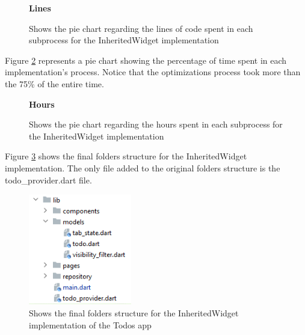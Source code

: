 \begin{figure}[H]
\caption*{\textbf{Lines}}
\centering
{}
 \caption{Shows the pie chart regarding the lines of code spent in each subprocess for the InheritedWidget implementation}
\label{image:inheritedwidgets_lines_piechart}
\end{figure}

Figure \ref{image:inheritedwidgets_hours_piechart} represents a pie chart showing the percentage of time spent in each implementation's process. Notice that the optimizations process took more than the 75\% of the entire time.
\begin{figure}[H]
 \caption*{\textbf{Hours}}
\centering
{}
 \caption{Shows the pie chart regarding the hours spent in each subprocess for the InheritedWidget implementation}
 \label{image:inheritedwidgets_hours_piechart}
\end{figure}

Figure \ref{fig:struttura_cartelle_inherited} shows the final folders structure for the InheritedWidget implementation. The only  file added to the original folders structure is the todo\_provider.dart file.

\begin{figure}[H]
    \centering
    \includegraphics[width=0.4\textwidth]{Images/struttura_cartelle_inherited.png}
    \caption{Shows the final folders structure for the InheritedWidget implementation of the Todos app}
    \label{fig:struttura_cartelle_inherited}
\end{figure}

